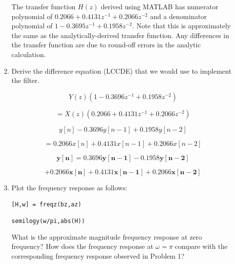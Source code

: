 \documentclass[fleqn]{article}
\begin{document}
\begin{enumerate}[nolistsep]
\begin{enumerate}
			The transfer function $H(z)$ derived using MATLAB has numerator polynomial of $0.2066 + 0.4131z^{-1} + 0.2066z^{-2}$ and a denominator polynomial of $1 - 0.3695z^{-1} + 0.1958z^{-2}$. Note that this is approximately the same as the analytically-derived transfer function. Any differences in the transfer function are due to round-off errors in the analytic calculation.
			
			\item Derive the difference equation (LCCDE) that we would use to implement the filter.
			
			\begin{equation*}
				Y(z)(1 - 0.3696z^{-1} + 0.1958z^{-2})
			\end{equation*}
			
			\begin{equation*}			
				= X(z)(0.2066 + 0.4131z^{-1} + 0.2066z^{-2})
			\end{equation*}
			
			\begin{equation*}
				y[n] - 0.3696y[n-1] + 0.1958y[n-2]
			\end{equation*}
			
			\begin{equation*}
				 = 0.2066x[n] + 0.4131x[n-1] + 0.2066x[n-2]
			\end{equation*}
			
			\begin{equation*}
				\mathbf{y[n] = 0.3696y[n-1] - 0.1958y[n-2]}
			\end{equation*}
			
			\begin{equation*}
				\mathbf{+ 0.2066x[n] + 0.4131x[n-1] + 0.2066x[n-2]}
			\end{equation*}
			
			\item Plot the frequency response as follows:
			
			\texttt{[H,w] = freqz(bz,az)}
			
			\texttt{semilogy(w/pi,abs(H))}
			
			What is the approximate magnitude frequency response at zero frequency? How does the frequency response at $\omega = \pi$ compare with the corresponding frequency response observed in Problem 1?
		\end{enumerate}
	\end{enumerate}
\end{document}

